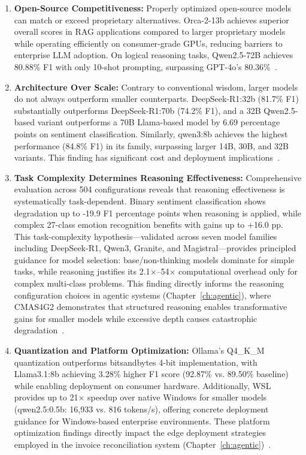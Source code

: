 \begin{enumerate}[leftmargin=*]
    \item \textbf{Open-Source Competitiveness:} Properly optimized open-source models can match or exceed proprietary alternatives. Orca-2-13b achieves superior overall scores in RAG applications compared to larger proprietary models while operating efficiently on consumer-grade GPUs, reducing barriers to enterprise LLM adoption. On logical reasoning tasks, Qwen2.5-72B achieves 80.88\% F1 with only 10-shot prompting, surpassing GPT-4o's 80.36\%~\cite{huang2024orca2rag,huang2024llama2,huang2025logical}.
    
    \item \textbf{Architecture Over Scale:} Contrary to conventional wisdom, larger models do not always outperform smaller counterparts. DeepSeek-R1:32b (81.7\% F1) substantially outperforms DeepSeek-R1:70b (74.2\% F1), and a 32B Qwen2.5-based variant outperforms a 70B Llama-based model by 6.69 percentage points on sentiment classification. Similarly, qwen3:8b achieves the highest performance (84.8\% F1) in its family, surpassing larger 14B, 30B, and 32B variants. This finding has significant cost and deployment implications~\cite{huang2025deepseek,huang2025reasoning_deployment}.
    
    \item \textbf{Task Complexity Determines Reasoning Effectiveness:} Comprehensive evaluation across 504 configurations reveals that reasoning effectiveness is systematically task-dependent. Binary sentiment classification shows degradation up to -19.9 F1 percentage points when reasoning is applied, while complex 27-class emotion recognition benefits with gains up to +16.0 pp. This task-complexity hypothesis---validated across seven model families including DeepSeek-R1, Qwen3, Granite, and Magistral---provides principled guidance for model selection: base/non-thinking models dominate for simple tasks, while reasoning justifies its 2.1$\times$--54$\times$ computational overhead only for complex multi-class problems. This finding directly informs the reasoning configuration choices in agentic systems (Chapter~\ref{ch:agentic}), where CMAS4G2 demonstrates that structured reasoning enables transformative gains for smaller models while excessive depth causes catastrophic degradation~\cite{huang2026complexity}.
    
    \item \textbf{Quantization and Platform Optimization:} Ollama's Q4\_K\_M quantization outperforms bitsandbytes 4-bit implementation, with Llama3.1:8b achieving 3.28\% higher F1 score (92.87\% vs. 89.50\% baseline) while enabling deployment on consumer hardware. Additionally, WSL provides up to 21$\times$ speedup over native Windows for smaller models (qwen2.5:0.5b: 16,933 vs. 816 tokens/s), offering concrete deployment guidance for Windows-based enterprise environments. These platform optimization findings directly impact the edge deployment strategies employed in the invoice reconciliation system (Chapter~\ref{ch:agentic})~\cite{huang2025edge}.
    

\end{enumerate}
